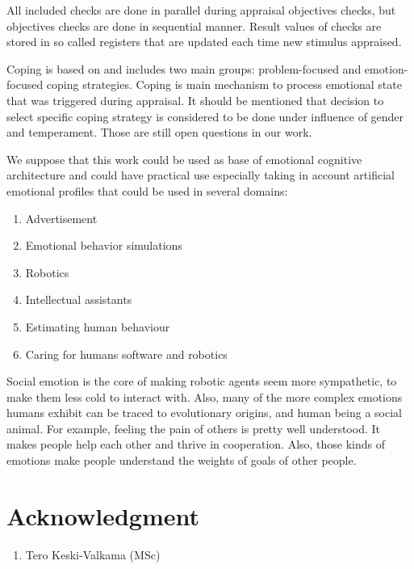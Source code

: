 All included checks are done in parallel during appraisal objectives checks, but objectives checks are done in sequential manner.
Result values of checks are stored in so called registers that are updated each time new stimulus appraised.

Coping is based on \cite{dont_worry_be_happy} and includes two main groups: problem-focused and emotion-focused coping strategies. Coping is main mechanism to process emotional state that was triggered during appraisal. It should be mentioned that decision to select specific coping strategy is considered to be done under influence of gender and temperament. Those are still open questions in our work.

We suppose that this work could be used as base of emotional cognitive architecture and could have practical use especially taking in account artificial emotional profiles that could be used in several domains:

\begin{enumerate}
 \item  Advertisement
 \item  Emotional behavior simulations
 \item  Robotics
 \item  Intellectual assistants
 \item  Estimating human behaviour
 \item  Caring for humans software and robotics
\end{enumerate}

Social emotion is the core of making robotic agents seem more sympathetic, to make them less cold to interact with.
Also, many of the more complex emotions humans exhibit can be traced to evolutionary origins, and human being a social animal.
For example, feeling the pain of others is pretty well understood. It makes people help each other and thrive in cooperation.
Also, those kinds of emotions make people understand the weights of goals of other people.

\section{Acknowledgment}

\begin{enumerate}
 \item Tero Keski-Valkama (MSc)
\end{enumerate}


